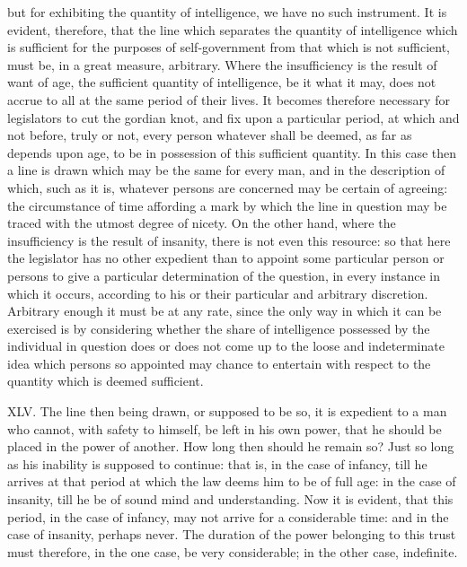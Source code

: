 \documentclass[12pt]{report}
\begin{document}
but for exhibiting the quantity of intelligence, we have no such
instrument. It is evident, therefore, that the line which separates the
quantity of intelligence which is sufficient for the purposes of
self-government from that which is not sufficient, must be, in a great
measure, arbitrary. Where the insufficiency is the result of want of
age, the sufficient quantity of intelligence, be it what it may, does
not accrue to all at the same period of their lives. It becomes
therefore necessary for legislators to cut the gordian knot, and fix
upon a particular period, at which and not before, truly or not, every
person whatever shall be deemed, as far as depends upon age, to be in
possession of this sufficient quantity. In this case then a line is
drawn which may be the same for every man, and in the description of
which, such as it is, whatever persons are concerned may be certain of
agreeing: the circumstance of time affording a mark by which the line in
question may be traced with the utmost degree of nicety. On the other
hand, where the insufficiency is the result of insanity, there is not
even this resource: so that here the legislator has no other expedient
than to appoint some particular person or persons to give a particular
determination of the question, in every instance in which it occurs,
according to his or their particular and arbitrary discretion. Arbitrary
enough it must be at any rate, since the only way in which it can be
exercised is by considering whether the share of intelligence possessed
by the individual in question does or does not come up to the loose and
indeterminate idea which persons so appointed may chance to entertain
with respect to the quantity which is deemed sufficient.

XLV. The line then being drawn, or supposed to be so, it is expedient to
a man who cannot, with safety to himself, be left in his own power, that
he should be placed in the power of another. How long then should he
remain so? Just so long as his inability is supposed to continue: that
is, in the case of infancy, till he arrives at that period at which the
law deems him to be of full age: in the case of insanity, till he be of
sound mind and understanding. Now it is evident, that this period, in
the case of infancy, may not arrive for a considerable time: and in the
case of insanity, perhaps never. The duration of the power belonging to
this trust must therefore, in the one case, be very considerable; in the
other case, indefinite.
\end{document}
